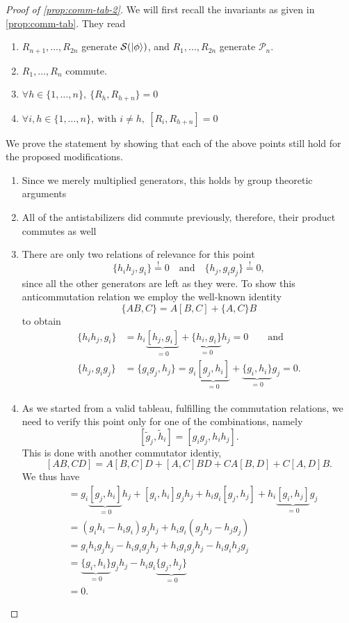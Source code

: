 \begin{proof}[Proof of \cref{prop:comm-tab-2}]
  We will first recall the invariants as given in \cref{prop:comm-tab}.
  They read
  \begin{enumerate}
    \item $R_{n+1},\ldots,R_{2n}$ generate $\mathcal{S}(\ket{\phi})$, and $R_1, \ldots,
      R_{2n}$ generate $\mathcal{P}_n$.
    \item $R_1, \ldots, R_n$ commute.
    \item $\forall h \in \{1,\ldots,n\}, \ \{R_h, R_{h+n}\} = 0$
    \item $\forall i,h \in \{1,\ldots,n\}, \ \text{with } i\neq h, \ [R_i, R_{h+n}] = 0$
  \end{enumerate}
  We prove the statement by showing that each of the above points still hold
  for the proposed modifications.
  \begin{enumerate}
    \item Since we merely multiplied generators, this holds by group theoretic
      arguments
    \item All of the antistabilizers did commute previously, therefore, their
      product commutes as well
    \item There are only two relations of relevance for this point
      \[
        \{h_i h_j, g_i\} \overset{\text{!}}{=} 0 \quad{\text{and}} \quad 
        \{h_j, g_i g_j\} \overset{\text{!}}{=} 0, 
      \]
      since all the other generators are left as they were.
      To show this anticommutation relation we employ the well-known identity
      \[ \{AB,C\} = A[B,C] + \{A,C\}B \]
      to obtain
      \begin{align*}
        \{h_i h_j, g_i \} &= h_i \underbrace{[h_j, g_i]}_{=0} +
        \underbrace{\{h_i, g_i\}}_{=0} h_j = 0 \qquad{\text{and}} \\
        \{h_j, g_i g_j \} &= \{g_i g_j, h_j\} = g_i \underbrace{[g_j, h_i]}_{=0} +
        \underbrace{\{g_i, h_i\}}_{=0} g_j = 0
      .\end{align*}
    \item As we started from a valid tableau, fulfilling the commutation
      relations, we need to verify this point only for one of the combinations,
      namely \[ [\tilde{g}_j, \tilde{h}_i] = [ g_i g_j, h_i h_j]. \]
      This is done with another commutator identiy,
      \[
        [AB,CD] = A[B,C]D + [A,C]BD + CA[B,D] + C[A,D]B.
      \]
      We thus have
      \begin{align*}
        [g_i g_j, h_i h_j] &=
          g_i \underbrace{[g_j, h_i]}_{=0} h_j + [g_i, h_i] g_j h_j + h_i g_i
          [g_j, h_j] + h_i \underbrace{[g_i, h_j]}_{=0} g_j \\
           &= (g_i h_i - h_i g_i)g_j h_j + h_i g_i (g_j h_j - h_j g_j) \\
           &= g_i h_i g_j h_j - h_i g_i g_j h_j + h_i g_i g_j h_j - h_i g_i h_j
           g_j \\
           &= \underbrace{\{g_i, h_i\}}_{=0} g_j h_j - h_i g_i
           \underbrace{\{g_j, h_j\}}_{=0} \\
           &= 0
      .\end{align*}
  \end{enumerate}
\end{proof}

